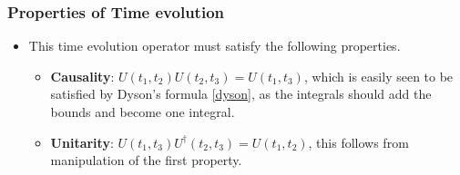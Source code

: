 \documentclass[11pt]{article}
\numberwithin{equation}{section}
\begin{document}
\subsubsection{Properties of Time evolution} %
\label{ssub:properties_of_time_evolution}
\begin{itemize}
  \item This time evolution operator must satisfy the following properties. 
\begin{itemize}
  \item \textbf{Causality}: $U(t_1,t_2)U(t_2,t_3) = U(t_1,t_3)$, which is easily seen to be satisfied by Dyson's formula \ref{dyson}, as the integrals should add the bounds and become one integral. 
  \item \textbf{Unitarity}: $U(t_1,t_3)U^{\dagger}(t_2,t_3) = U(t_1,t_2)$, this follows from manipulation of the first property.
\end{itemize}
\end{itemize}
\end{document}
